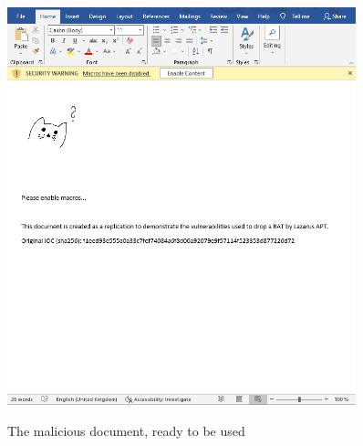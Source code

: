 \begin{figure}[H]
  \centering
  \includegraphics[width=0.9\textwidth]{figures/malicious_document.png}
  \label{malicious_document}
  \caption{The malicious document, ready to be used}
\end{figure}

\clearpage


